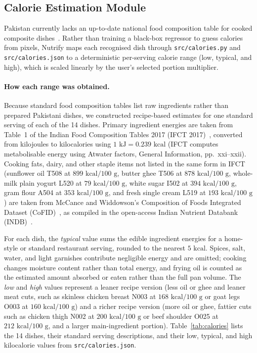 \subsection{Calorie Estimation Module}

Pakistan currently lacks an up-to-date national food composition table for
cooked composite dishes~\cite{soomro2024matiari}. Rather than training a black-box
regressor to guess calories from pixels, Nutrify maps each recognised dish
through \texttt{src/calories.py} and \texttt{src/calories.json} to a
deterministic per-serving calorie range (low, typical, and high), which is
scaled linearly by the user's selected portion multiplier.

\paragraph{How each range was obtained.}
Because standard food composition tables list raw ingredients rather than
prepared Pakistani dishes, we constructed recipe-based estimates for one
standard serving of each of the 14 dishes. Primary ingredient energies are
taken from Table~1 of the Indian Food Composition Tables 2017 (IFCT
2017)~\cite{longvah2017ifct}, converted from kilojoules to kilocalories using
$1\text{ kJ} = 0.239\text{ kcal}$ (IFCT computes metabolisable energy using
Atwater factors, General Information, pp.~xxi--xxii). Cooking fats, dairy, and
other staple items not listed in the same form in IFCT (sunflower oil T508 at
$899\text{ kcal/100 g}$, butter ghee T506 at $878\text{ kcal/100 g}$, whole-milk
plain yogurt L520 at $79\text{ kcal/100 g}$, white sugar I502 at
$394\text{ kcal/100 g}$, gram flour A504 at $353\text{ kcal/100 g}$, and fresh
single cream L519 at $193\text{ kcal/100 g}$) are taken from McCance and
Widdowson's Composition of Foods Integrated Dataset (CoFID)~\cite{cofid2021},
as compiled in the open-access Indian Nutrient Databank
(INDB)~\cite{vijayakumar2024indb}.

For each dish, the \emph{typical} value sums the edible ingredient energies for
a home-style or standard restaurant serving, rounded to the nearest
$5\text{ kcal}$. Spices, salt, water, and light garnishes contribute negligible
energy and are omitted; cooking changes moisture content rather than total
energy, and frying oil is counted as the estimated amount absorbed or eaten
rather than the full pan volume. The \emph{low} and \emph{high} values
represent a leaner recipe version (less oil or ghee and leaner meat cuts, such
as skinless chicken breast N003 at $168\text{ kcal/100 g}$ or goat legs O003 at
$160\text{ kcal/100 g}$) and a richer recipe version (more oil or ghee, fattier
cuts such as chicken thigh N002 at $200\text{ kcal/100 g}$ or beef shoulder
O025 at $212\text{ kcal/100 g}$, and a larger main-ingredient portion).
Table~\ref{tab:calories} lists the 14 dishes, their standard serving
descriptions, and their low, typical, and high kilocalorie values from
\texttt{src/calories.json}.

